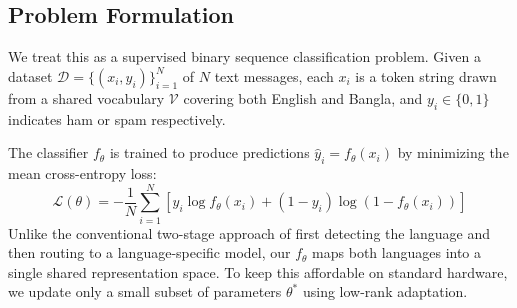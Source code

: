 \documentclass[journal]{IEEEtran}
\begin{document}
\subsection{Problem Formulation}

We treat this as a supervised binary sequence classification problem. Given a dataset $\mathcal{D} = \{(x_i, y_i)\}_{i=1}^{N}$ of $N$ text messages, each $x_i$ is a token string drawn from a shared vocabulary $\mathcal{V}$ covering both English and Bangla, and $y_i \in \{0, 1\}$ indicates ham or spam respectively.

The classifier $f_\theta$ is trained to produce predictions $\hat{y}_i = f_\theta(x_i)$ by minimizing the mean cross-entropy loss:
\begin{equation}
\mathcal{L}(\theta) = -\frac{1}{N} \sum_{i=1}^{N} \left[ y_i \log f_\theta(x_i) + (1 - y_i) \log (1 - f_\theta(x_i)) \right]
\end{equation}
Unlike the conventional two-stage approach of first detecting the language and then routing to a language-specific model, our $f_\theta$ maps both languages into a single shared representation space. To keep this affordable on standard hardware, we update only a small subset of parameters $\theta^*$ using low-rank adaptation.
\end{document}
